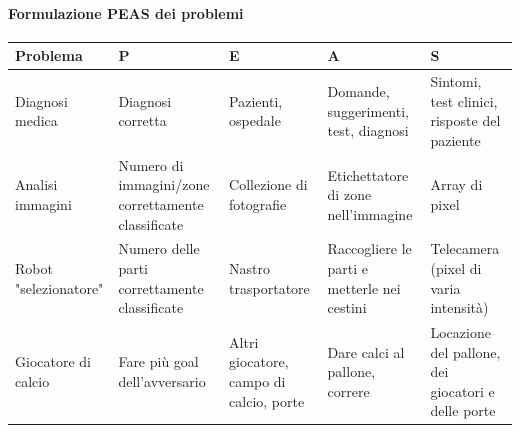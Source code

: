 \documentclass[10pt]{book}
\begin{document}
\paragraph{Formulazione PEAS dei problemi}
\begin{center}
	\begin{tabular}{p{3cm} | p{3cm} | p{3cm} | p{3cm} | p{3cm}}
		\textbf{Problema} & \textbf{P} & \textbf{E} & \textbf{A} & \textbf{S} \\
		\hline
		Diagnosi medica & Diagnosi corretta & Pazienti, ospedale & Domande, suggerimenti, test, diagnosi & Sintomi, test clinici, risposte del paziente \\
		\hline
		Analisi immagini & Numero di immagini/zone correttamente classificate & Collezione di fotografie & Etichettatore di zone nell'immagine & Array di pixel \\
		\hline
		Robot "selezionatore" & Numero delle parti correttamente classificate & Nastro trasportatore & Raccogliere le parti e metterle nei cestini & Telecamera (pixel di varia intensità) \\
		\hline
		Giocatore di calcio & Fare più goal dell'avversario & Altri giocatore, campo di calcio, porte & Dare calci al pallone, correre & Locazione del pallone, dei giocatori e delle porte
	\end{tabular}
\end{center}
\end{document}
